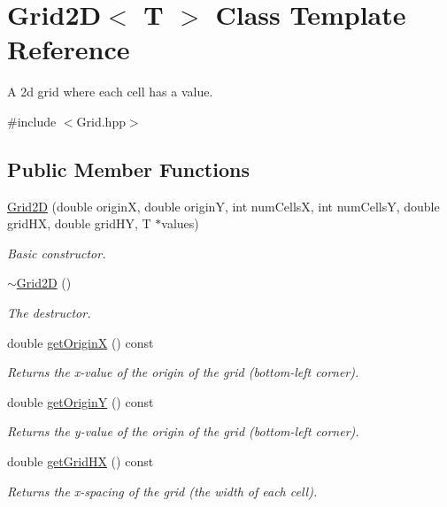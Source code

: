 \hypertarget{class_grid2_d}{\section{Grid2\-D$<$ T $>$ Class Template Reference}
\label{class_grid2_d}
}


A 2d grid where each cell has a value.  




{\ttfamily \#include $<$Grid.\-hpp$>$}

\subsection*{Public Member Functions}
\begin{DoxyCompactItemize}
\item 
\hyperlink{class_grid2_d_a2d0de43afc44cfa9b1f85e2a89407987}{Grid2\-D} (double origin\-X, double origin\-Y, int num\-Cells\-X, int num\-Cells\-Y, double grid\-H\-X, double grid\-H\-Y, T $\ast$values)
\begin{DoxyCompactList}\small\item\em Basic constructor. \end{DoxyCompactList}\item 
\hyperlink{class_grid2_d_a882eef0c27a9c0dc379254633f6b4632}{$\sim$\-Grid2\-D} ()
\begin{DoxyCompactList}\small\item\em The destructor. \end{DoxyCompactList}\item 
double \hyperlink{class_grid2_d_a297945ebee6053b879eb2302fb997257}{get\-Origin\-X} () const 
\begin{DoxyCompactList}\small\item\em Returns the x-\/value of the origin of the grid (bottom-\/left corner). \end{DoxyCompactList}\item 
double \hyperlink{class_grid2_d_ae84fe7442dccef0d49eedc65fe96b06a}{get\-Origin\-Y} () const 
\begin{DoxyCompactList}\small\item\em Returns the y-\/value of the origin of the grid (bottom-\/left corner). \end{DoxyCompactList}\item 
double \hyperlink{class_grid2_d_a93655a3d92f6f98eeb6ec5826cd89249}{get\-Grid\-H\-X} () const 
\begin{DoxyCompactList}\small\item\em Returns the x-\/spacing of the grid (the width of each cell). \end{DoxyCompactList}\item 

\end{DoxyCompactItemize}
